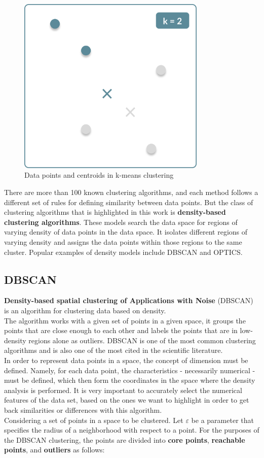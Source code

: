     \begin{figure}[H]
        \centering
        \includegraphics[width=9cm]{Images/1/kmeans.png}
        \caption{Data points and centroids in k-means clustering}
    \end{figure}
    
    There are more than 100 known clustering algorithms, and each method follows a different set of rules for defining similarity between data points. But the class of clustering algorithms that is highlighted in this work is \textbf{density-based clustering algorithms}. These models search the data space for regions of varying density of data points in the data space. It isolates different regions of varying density and assigns the data points within those regions to the same cluster. Popular examples of density models include DBSCAN and OPTICS.
    
    
    \subsection{DBSCAN}
    \textbf{Density-based spatial clustering of Applications with Noise} (DBSCAN) is an algorithm for clustering data based on density.
    \\
    The algorithm works with a given set of points in a given space, it groups the points that are close enough to each other and labels the points that are in low-density regions alone as outliers. DBSCAN is one of the most common clustering algorithms and is also one of the most cited in the scientific literature.
    \\
    In order to represent data points in a space, the concept of dimension must be defined. Namely, for each data point, the characteristics - necessarily numerical - must be defined, which then form the coordinates in the space where the density analysis is performed. It is very important to accurately select the numerical features of the data set, based on the ones we want to highlight in order to get back similarities or differences with this algorithm.
    \\
    Considering a set of points in a space to be clustered. Let $\varepsilon$ be a parameter that specifies the radius of a neighborhood with respect to a point.
    For the purposes of the DBSCAN clustering, the points are divided into \textbf{core points}, \textbf{reachable points}, and \textbf{outliers} as follows:
        
